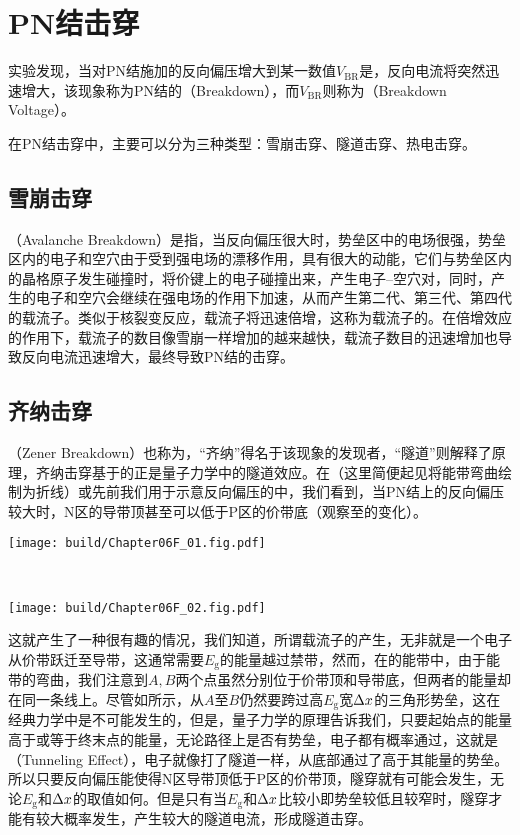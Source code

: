 \section{PN结击穿}
实验发现，当对PN结施加的反向偏压增大到某一数值$V_\text{BR}$是，反向电流将突然迅速增大，该现象称为PN结的（Breakdown），而$V_\text{BR}$则称为（Breakdown Voltage）。

在PN结击穿中，主要可以分为三种类型：雪崩击穿、隧道击穿、热电击穿。

\subsection{雪崩击穿}
（Avalanche Breakdown）是指，当反向偏压很大时，势垒区中的电场很强，势垒区内的电子和空穴由于受到强电场的漂移作用，具有很大的动能，它们与势垒区内的晶格原子发生碰撞时，将价键上的电子碰撞出来，产生电子--空穴对，同时，产生的电子和空穴会继续在强电场的作用下加速，从而产生第二代、第三代、第四代的载流子。类似于核裂变反应，载流子将迅速倍增，这称为载流子的。在倍增效应的作用下，载流子的数目像雪崩一样增加的越来越快，载流子数目的迅速增加也导致反向电流迅速增大，最终导致PN结的击穿。

\subsection{齐纳击穿}
（Zener Breakdown）也称为，“齐纳”得名于该现象的发现者，“隧道”则解释了原理，齐纳击穿基于的正是量子力学中的隧道效应。在（这里简便起见将能带弯曲绘制为折线）或先前我们用于示意反向偏压的中，我们看到，当PN结上的反向偏压较大时，N区的导带顶甚至可以低于P区的价带底（观察至的变化）。

\begin{Figure}[齐纳击穿]
    \begin{FigureSub}[反向偏压较小]
        \texttt{[image: build/Chapter06F\_01.fig.pdf]}
    \end{FigureSub}\\ \vspace{0.5cm}
    \begin{FigureSub}[反向偏压较大]
        \texttt{[image: build/Chapter06F\_02.fig.pdf]}
    \end{FigureSub}
\end{Figure}

这就产生了一种很有趣的情况，我们知道，所谓载流子的产生，无非就是一个电子从价带跃迁至导带，这通常需要$E_\text{g}$的能量越过禁带，然而，在的能带中，由于能带的弯曲，我们注意到$A,B$两个点虽然分别位于价带顶和导带底，但两者的能量却在同一条线上。尽管如所示，从$A$至$B$仍然要跨过高$E_\text{g}$宽$\Delta{x}$的三角形势垒，这在经典力学中是不可能发生的，但是，量子力学的原理告诉我们，只要起始点的能量高于或等于终末点的能量，无论路径上是否有势垒，电子都有概率通过，这就是（Tunneling Effect），电子就像打了隧道一样，从底部通过了高于其能量的势垒。所以只要反向偏压能使得N区导带顶低于P区的价带顶，隧穿就有可能会发生，无论$E_\text{g}$和$\Delta{x}$的取值如何。但是只有当$E_\text{g}$和$\Delta{x}$比较小即势垒较低且较窄时，隧穿才能有较大概率发生，产生较大的隧道电流，形成隧道击穿。

